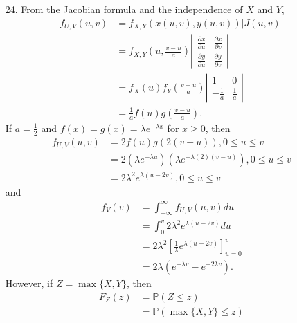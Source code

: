 \documentclass[a4paper,12pt]{article}
\begin{document}
\begin{enumerate}
    \item[24.] 
        From the Jacobian formula and the independence of $X$ and $Y$,
        \begin{align*}
            f_{U, V}(u, v) &= f_{X, Y}(x(u, v), y(u, v)) |J(u, v)| \\
            &= f_{X, Y} \left( u, \frac{v - u}{a} \right) 
            \left| \begin{array}{cc}
                \frac{\partial x}{\partial u} & \frac{\partial x}{\partial v} \\
                \frac{\partial y}{\partial u} & \frac{\partial y}{\partial v}
            \end{array} \right| \\
            &= f_X(u) f_Y\left( \frac{v - u}{a} \right)
            \left| \begin{array}{cc}
                1 & 0 \\
                -\frac{1}{a} & \frac{1}{a}
            \end{array} \right| \\
            &= \frac{1}{a} f(u) g\left( \frac{v - u}{a} \right).
        \end{align*}
        If $a = \frac{1}{2}$ and $f(x) = g(x) = \lambda e^{-\lambda x}$ for $x \geq 0$, then
        \begin{align*}
            f_{U, V}(u, v) &= 2 f(u) g(2(v - u)), 0 \leq u \leq v \\
            &= 2 \left( \lambda e^{-\lambda u} \right) \left( \lambda e^{-\lambda(2)(v - u)} \right), 0 \leq u \leq v \\
            &= 2 \lambda^2 e^{\lambda(u - 2v)}, 0 \leq u \leq v
        \end{align*}
        and
        \begin{align*}
            f_V(v) &= \int_{-\infty}^\infty f_{U, V}(u, v) du \\
            &= \int_0^v 2 \lambda^2 e^{\lambda(u - 2v)} du \\
            &= 2 \lambda^2 \left[ \frac{1}{\lambda} e^{\lambda(u - 2v)} \right]_{u = 0}^v \\
            &= 2 \lambda \left( e^{-\lambda v} - e^{-2\lambda v} \right).
        \end{align*}
        However, if $Z = \max\{X, Y\}$, then
        \begin{align*}
            F_Z(z) &= \mathbb{P}(Z \leq z) \\
            &= \mathbb{P}(\max\{X, Y\} \leq z) \\

\end{align*}
\end{enumerate}
\end{document}
